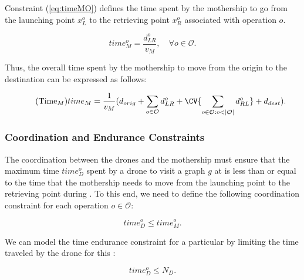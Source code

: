 {\noindent
Constraint (\ref{eq:timeMO}) defines the time spent by the mothership to go from the launching point $x_L^o$ to the retrieving point $x_R^o$ associated with operation $o$.

\begin{equation}\tag{Time$_M^o$}
time_M^o = \frac{d_{LR}^o}{v_M}, \quad \forall o \in \mathcal O.
\label{eq:timeMO}
\end{equation}

\noindent
Thus, the overall time spent by the mothership to move from the origin to the destination can be expressed as follows:

\begin{equation}\tag{Time$_M$}
time_M = \frac{1}{v_M} (d_{orig} + \sum_{o \in \mathcal O} d_{LR}^o + \CV{\sum_{o \in \mathcal O:o<|\mathcal O|} d_{RL}^o} + d_{dest}).
\label{eq:timeM}
\end{equation}



\subsubsection*{Coordination and Endurance Constraints}
\noindent
The coordination between the drones and the mothership must ensure that the maximum time $time_D^o$ spent by a drone to visit a graph $g$ at  is less than or equal to the time that the mothership needs to move from the launching point to the retrieving point during . To this end, we need to define the following coordination constraint for each operation $o\in \mathcal O$:

\begin{equation}\tag{DCW-CO}\label{DCW}
time_D^o \leq time_M^o.
\end{equation}



\noindent
We can model the time endurance constraint for a particular  by limiting the time traveled by the drone for this :

\begin{equation}\tag{Endurance-CO}\label{CAP}
    time_D^o \leq N_D.
\end{equation}


}
